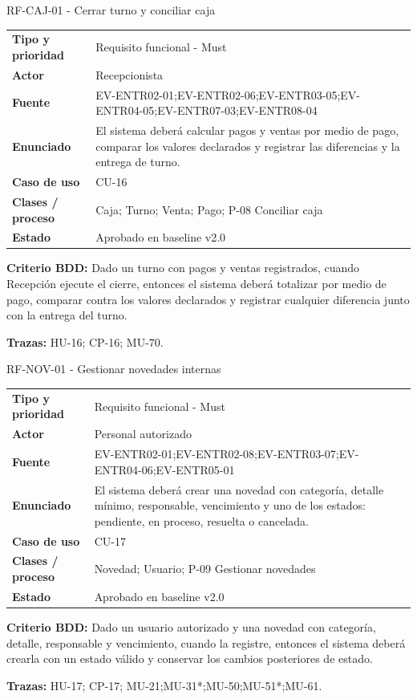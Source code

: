 \begin{reqbox}{RF-CAJ-01 - Cerrar turno y conciliar caja}
\begin{tabularx}{\textwidth}{>{\bfseries}p{3.2cm}Y}
Tipo y prioridad & Requisito funcional - Must \\
Actor & Recepcionista \\
Fuente & EV-ENTR02-01;EV-ENTR02-06;EV-ENTR03-05;EV-ENTR04-05;EV-ENTR07-03;EV-ENTR08-04 \\
Enunciado & El sistema deberá calcular pagos y ventas por medio de pago, comparar los valores declarados y registrar las diferencias y la entrega de turno. \\
Caso de uso & CU-16 \\
Clases / proceso & Caja; Turno; Venta; Pago; P-08 Conciliar caja \\
Estado & Aprobado en baseline v2.0 \\
\end{tabularx}
\textbf{Criterio BDD:} Dado un turno con pagos y ventas registrados, cuando Recepción ejecute el cierre, entonces el sistema deberá totalizar por medio de pago, comparar contra los valores declarados y registrar cualquier diferencia junto con la entrega del turno.

\textbf{Trazas:} HU-16; CP-16; MU-70.
\end{reqbox}


\begin{reqbox}{RF-NOV-01 - Gestionar novedades internas}
\begin{tabularx}{\textwidth}{>{\bfseries}p{3.2cm}Y}
Tipo y prioridad & Requisito funcional - Must \\
Actor & Personal autorizado \\
Fuente & EV-ENTR02-01;EV-ENTR02-08;EV-ENTR03-07;EV-ENTR04-06;EV-ENTR05-01 \\
Enunciado & El sistema deberá crear una novedad con categoría, detalle mínimo, responsable, vencimiento y uno de los estados: pendiente, en proceso, resuelta o cancelada. \\
Caso de uso & CU-17 \\
Clases / proceso & Novedad; Usuario; P-09 Gestionar novedades \\
Estado & Aprobado en baseline v2.0 \\
\end{tabularx}
\textbf{Criterio BDD:} Dado un usuario autorizado y una novedad con categoría, detalle, responsable y vencimiento, cuando la registre, entonces el sistema deberá crearla con un estado válido y conservar los cambios posteriores de estado.

\textbf{Trazas:} HU-17; CP-17; MU-21;MU-31*;MU-50;MU-51*;MU-61.
\end{reqbox}


